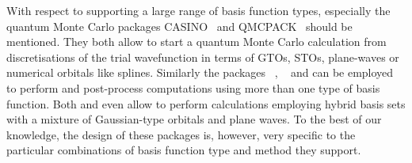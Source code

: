 With respect to supporting a large range of basis function types,
especially the quantum Monte Carlo packages CASINO~\cite{Needs2010}
and QMCPACK~\cite{Kim2012} should be mentioned.
They both allow to start a quantum Monte Carlo calculation
from discretisations of the trial wavefunction
in terms of GTOs, STOs, plane-waves or numerical orbitals like splines.
Similarly the packages \CPtK~\cite{Hutter2014}, \ASE~\cite{Larsen2017}
and \gpaw can be employed to perform and post-process computations
using more than one type of basis function.
Both \gpaw and \CPtK even allow to perform calculations
employing hybrid basis sets with a mixture of
Gaussian-type orbitals and plane waves.
To the best of our knowledge,
the design of these packages is, however,
very specific to the particular combinations of basis function type
and method they support.
